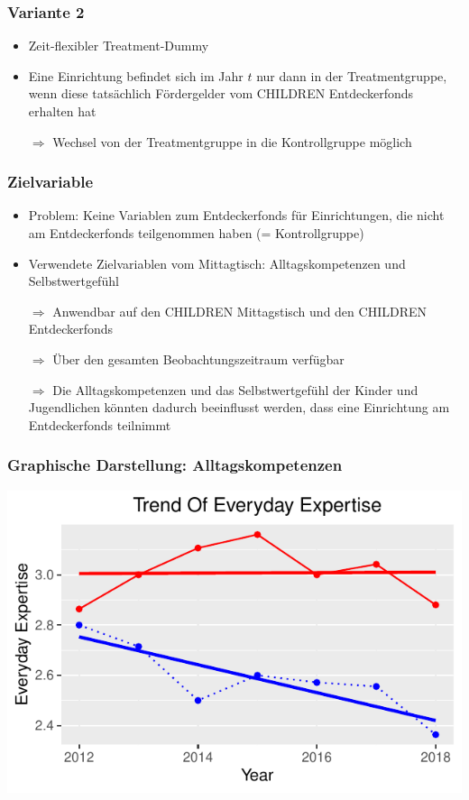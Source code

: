 \begin{frame}[fragile]
\begin{itemize}
\begin{frame}
\begin{itemize}
\begin{frame}[fragile]
\frametitle{Variante 2}
\begin{itemize}
\item Zeit-flexibler Treatment-Dummy
\item Eine Einrichtung befindet sich im Jahr $t$ nur dann in der Treatmentgruppe, wenn diese tatsächlich Fördergelder vom CHILDREN Entdeckerfonds erhalten hat
\item [$\Rightarrow$] Wechsel von der Treatmentgruppe in die Kontrollgruppe möglich
\end{itemize}
\end{frame}

\begin{frame}[fragile]
\frametitle{Zielvariable}
\begin{itemize}
\item Problem: Keine Variablen zum Entdeckerfonds für Einrichtungen, die nicht am Entdeckerfonds teilgenommen haben (= Kontrollgruppe) 
\item Verwendete Zielvariablen vom Mittagtisch: Alltagskompetenzen und Selbstwertgefühl
\item [$\Rightarrow$] Anwendbar auf den CHILDREN Mittagstisch und den CHILDREN Entdeckerfonds 
\item [$\Rightarrow$] Über den gesamten Beobachtungszeitraum verfügbar
\item [$\Rightarrow$] Die Alltagskompetenzen und das Selbstwertgefühl der Kinder und Jugendlichen könnten dadurch beeinflusst werden, dass eine Einrichtung am Entdeckerfonds teilnimmt
\end{itemize}
\end{frame}

\begin{frame}[fragile]
\frametitle{Graphische Darstellung: Alltagskompetenzen}
\begin{knitrout}\footnotesize
{}\color{fgcolor}

{\centering \includegraphics[width=\maxwidth]{figure/beamer-DIDDtdsplot-1} 

}
\end{knitrout}
\end{frame}
\end{itemize}
\end{frame}
\end{itemize}
\end{frame}
